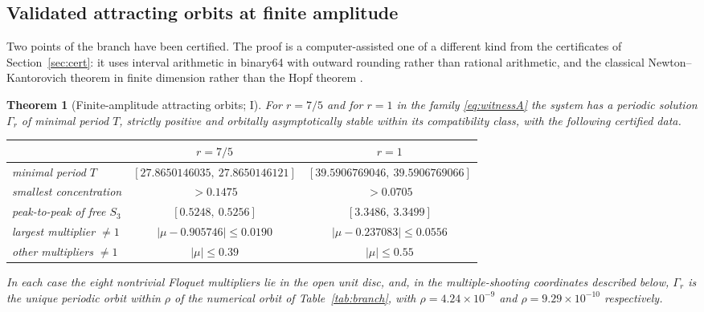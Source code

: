 \documentclass[11pt,a4paper]{article}
\theoremstyle{plain}
\newtheorem{theorem}{Theorem}[section]
\theoremstyle{definition}
\theoremstyle{remark}
\newcommand{\evI}{\textsf{I}}
\begin{document}
\subsection{Validated attracting orbits at finite amplitude}\label{sec:orbit}
Two points of the branch have been certified. The proof is a computer-assisted one of a different kind from the certificates of Section~\ref{sec:cert}: it uses interval arithmetic in binary64 with outward rounding rather than rational arithmetic, and the classical Newton--Kantorovich theorem in finite dimension rather than the Hopf theorem \cite{Tucker11,vandenBergLessard15}.

\begin{theorem}[Finite-amplitude attracting orbits; \evI]\label{thm:orbit}
For $r=7/5$ and for $r=1$ in the family \eqref{eq:witnessA} the system has a periodic solution $\Gamma_r$ of minimal period $T$, strictly positive and orbitally asymptotically stable within its compatibility class, with the following certified data.
\begin{center}\upshape\small\setlength{\tabcolsep}{4pt}
\begin{tabular}{lcc}
\toprule
 & $r=7/5$ & $r=1$\\
\midrule
minimal period $T$ & $[27.8650146035,\ 27.8650146121]$ & $[39.5906769046,\ 39.5906769066]$\\
smallest concentration & $>0.1475$ & $>0.0705$\\
peak-to-peak of free $S_3$ & $[0.5248,\ 0.5256]$ & $[3.3486,\ 3.3499]$\\
largest multiplier $\ne1$ & $|\mu-0.905746|\le0.0190$ & $|\mu-0.237083|\le0.0556$\\
other multipliers $\ne1$ & $|\mu|\le0.39$ & $|\mu|\le0.55$\\
\bottomrule
\end{tabular}
\end{center}
In each case the eight nontrivial Floquet multipliers lie in the open unit disc, and, in the multiple-shooting coordinates described below, $\Gamma_r$ is the unique periodic orbit within $\rho$ of the numerical orbit of Table~\ref{tab:branch}, with $\rho=4.24\times10^{-9}$ and $\rho=9.29\times10^{-10}$ respectively.
\end{theorem}
\end{document}

